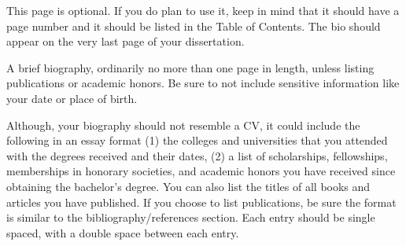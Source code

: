\biography
This page is optional. If you do plan to use it, keep in mind that it should have a page number and it should be listed in the Table of Contents. The bio should appear on the very last page of your dissertation.

A brief biography, ordinarily no more than one page in length, unless listing publications or academic honors.  Be sure to not include sensitive information like your date or place of birth.  

Although, your biography should not resemble a CV, it could include the following in an essay format  (1) the colleges and universities that you attended with the degrees received and their dates, (2) a list of scholarships, fellowships, memberships in honorary societies, and academic honors you have received since obtaining the bachelor’s degree.  You can also list the titles of all books and articles you have published.  If you choose to list publications, be sure the format is similar to the bibliography/references section.  Each entry should be single spaced, with a double space between each entry.


